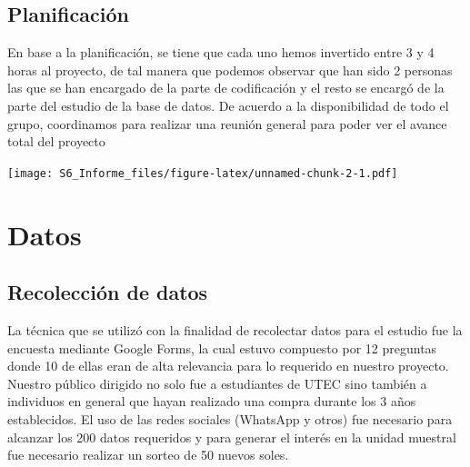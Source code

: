 \documentclass[
]{article}
\begin{document}
\hypertarget{planificaciuxf3n}{%
\subsection{\texorpdfstring{\textbf{Planificación}}{Planificación}}\label{planificaciuxf3n}}

En base a la planificación, se tiene que cada uno hemos invertido entre
3 y 4 horas al proyecto, de tal manera que podemos observar que han sido
2 personas las que se han encargado de la parte de codificación y el
resto se encargó de la parte del estudio de la base de datos. De acuerdo
a la disponibilidad de todo el grupo, coordinamos para realizar una
reunión general para poder ver el avance total del proyecto

\texttt{[image: S6\_Informe\_files/figure-latex/unnamed-chunk-2-1.pdf]}

\hypertarget{datos}{%
\section{\texorpdfstring{\textbf{Datos}}{Datos}}\label{datos}}

\hypertarget{recolecciuxf3n-de-datos}{%
\subsection{\texorpdfstring{\textbf{Recolección de
datos}}{Recolección de datos}}\label{recolecciuxf3n-de-datos}}

La técnica que se utilizó con la finalidad de recolectar datos para el
estudio fue la encuesta mediante Google Forms, la cual estuvo compuesto
por 12 preguntas donde 10 de ellas eran de alta relevancia para lo
requerido en nuestro proyecto. Nuestro público dirigido no solo fue a
estudiantes de UTEC sino también a individuos en general que hayan
realizado una compra durante los 3 años establecidos. El uso de las
redes sociales (WhatsApp y otros) fue necesario para alcanzar los 200
datos requeridos y para generar el interés en la unidad muestral fue
necesario realizar un sorteo de 50 nuevos soles.
\end{document}

